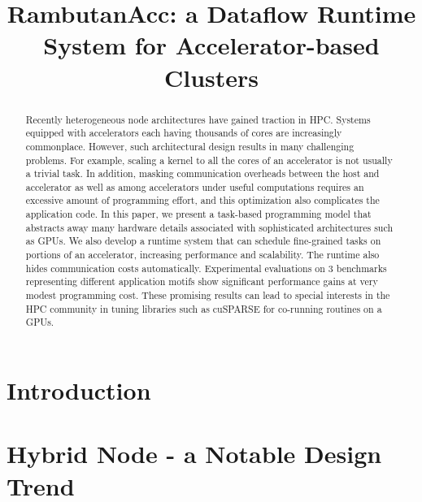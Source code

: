 \documentclass[sigconf]{acmart}
\begin{document}
\title{RambutanAcc: a Dataflow Runtime System for Accelerator-based Clusters}




\begin{abstract}
Recently heterogeneous node architectures have gained traction in HPC.
Systems equipped with accelerators each having thousands of cores are increasingly commonplace.
However, such architectural design results in many challenging problems.
For example, scaling a kernel to all the cores of an accelerator is not usually a trivial task.
In addition, masking communication overheads between the host and accelerator as well as among accelerators under useful computations requires an excessive amount of programming effort, and this optimization also complicates the application code.
In this paper, we present a task-based programming model that abstracts away many hardware details associated with sophisticated architectures such as GPUs.
We also develop a runtime system that can schedule fine-grained tasks on portions of an accelerator, increasing performance and scalability.
The runtime also hides communication costs automatically.
Experimental evaluations on 3 benchmarks representing different application motifs show significant performance gains at very modest programming cost.
These promising results can lead to special interests in the HPC community in tuning libraries such as cuSPARSE for co-running routines on a GPUs.
\end{abstract}

\maketitle

\section{Introduction}
\label{sec:intro}


\section{Hybrid Node - a Notable Design Trend}
\label{sec:motivation}

\end{document}
